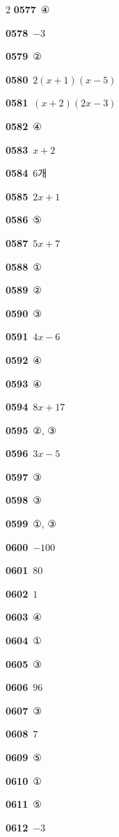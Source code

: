 \documentclass[10pt,a4paper]{article}
\begin{document}
\begin{multicols}{2}
\noindent\textbf{0577}\ ④\par
\noindent\textbf{0578}\ $-3$\par
\noindent\textbf{0579}\ ②\par
\noindent\textbf{0580}\ $2(x+1)(x-5)$\par
\noindent\textbf{0581}\ $(x+2)(2x-3)$\par
\noindent\textbf{0582}\ ④\par
\noindent\textbf{0583}\ $x+2$\par
\noindent\textbf{0584}\ 6개\par
\noindent\textbf{0585}\ $2x+1$\par
\noindent\textbf{0586}\ ⑤\par
\noindent\textbf{0587}\ $5x+7$\par
\noindent\textbf{0588}\ ①\par
\noindent\textbf{0589}\ ②\par
\noindent\textbf{0590}\ ③\par
\noindent\textbf{0591}\ $4x-6$\par
\noindent\textbf{0592}\ ④\par
\noindent\textbf{0593}\ ④\par
\noindent\textbf{0594}\ $8x+17$\par
\noindent\textbf{0595}\ ②, ③\par
\noindent\textbf{0596}\ $3x-5$\par
\noindent\textbf{0597}\ ③\par
\noindent\textbf{0598}\ ③\par
\noindent\textbf{0599}\ ①, ③\par
\noindent\textbf{0600}\ $-100$\par
\noindent\textbf{0601}\ $80$\par
\noindent\textbf{0602}\ $1$\par
\noindent\textbf{0603}\ ④\par
\noindent\textbf{0604}\ ①\par
\noindent\textbf{0605}\ ③\par
\noindent\textbf{0606}\ $96$\par
\noindent\textbf{0607}\ ③\par
\noindent\textbf{0608}\ $7$\par
\noindent\textbf{0609}\ ⑤\par
\noindent\textbf{0610}\ ①\par
\noindent\textbf{0611}\ ⑤\par
\noindent\textbf{0612}\ $-3$\par

\end{multicols}
\end{document}
